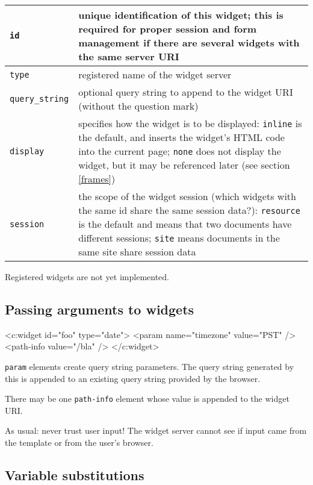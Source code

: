 \documentclass[a4paper,12pt]{article}
\begin{document}
\begin{tabular}{|l|p{8cm}|}
\hline
\texttt{id} & unique identification of this widget; this is required
for proper session and form management if there are several widgets
with the same server URI \\
\hline
\texttt{type} & registered name of the widget server \\
\hline
\texttt{query\_string} & optional query string to append to the widget
URI (without the question mark) \\
\hline

\texttt{display} & specifies how the widget is to be displayed:
\texttt{inline} is the default, and inserts the widget's HTML code
into the current page; \texttt{none} does not display the widget, but
it may be referenced later (see section \ref{frames}) \\

\hline
\texttt{session} & the scope of the widget session (which widgets with
the same id share the same session data?): \texttt{resource} is the
default and means that two documents have different sessions;
\texttt{site} means documents in the same site share session data \\

\hline
\end{tabular}

Registered widgets are not yet implemented.

\subsection{Passing arguments to widgets}

\begin{verbatim*}
<c:widget id="foo" type="date">
  <param name="timezone" value="PST" />
  <path-info value="/bla" />
</c:widget>
\end{verbatim*}

\texttt{param} elements create query string parameters.  The query
string generated by this is appended to an existing query string
provided by the browser.

There may be one \texttt{path-info} element whose value is appended to
the widget URI.

As usual: never trust user input!  The widget server cannot see if
input came from the template or from the user's browser.

\subsection{Variable substitutions}
\end{document}

